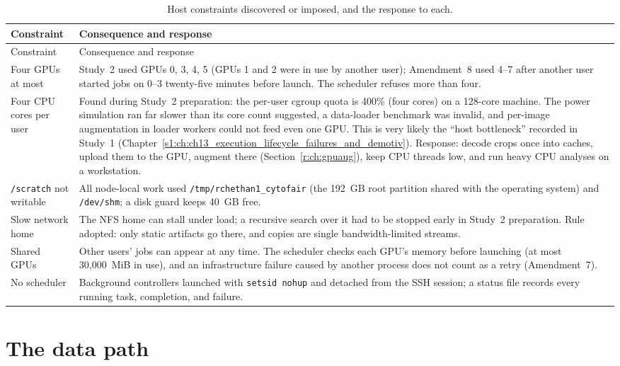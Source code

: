 \begin{longtable}{p{}p{}}
\caption{Host constraints discovered or imposed, and the response to each.}\label{r:tab:host}\\
\toprule
Constraint & Consequence and response \\
\midrule
\endfirsthead
\toprule
Constraint & Consequence and response \\
\midrule
\endhead
\bottomrule
\endfoot
Four GPUs at most & Study~2 used GPUs 0, 3, 4, 5 (GPUs 1 and 2 were in use by another user); Amendment~8 used 4--7 after
another user started jobs on 0--3 twenty-five minutes before launch. The scheduler refuses more than four. \\
Four CPU cores per user & Found during Study~2 preparation: the per-user cgroup quota is 400\% (four cores) on a
128-core machine. The power simulation ran far slower than its core count suggested, a data-loader benchmark was invalid,
and per-image augmentation in loader workers could not feed even one GPU. This is very likely the ``host bottleneck''
recorded in Study~1 (Chapter~\ref{s1:ch:ch13_execution_lifecycle_failures_and_demotiv}). Response: decode crops once into
caches, upload them to the GPU, augment there (Section~\ref{r:ch:gpuaug}), keep CPU threads low, and run heavy CPU
analyses on a workstation. \\
\texttt{/scratch} not writable & All node-local work used \texttt{/tmp/rchethan1\_cytofair} (the 192~GB root partition
shared with the operating system) and \texttt{/dev/shm}; a disk guard keeps 40~GB free. \\
Slow network home & The NFS home can stall under load; a recursive search over it had to be stopped early in Study~2
preparation. Rule adopted: only static artifacts go there, and copies are single bandwidth-limited streams. \\
Shared GPUs & Other users' jobs can appear at any time. The scheduler checks each GPU's memory before launching
(at most 30,000~MiB in use), and an infrastructure failure caused by another process does not count as a retry
(Amendment~7). \\
No scheduler & Background controllers launched with \texttt{setsid nohup} and detached from the SSH session; a status
file records every running task, completion, and failure. \\
\end{longtable}

\section{The data path}
\label{r:ch:datapath}

